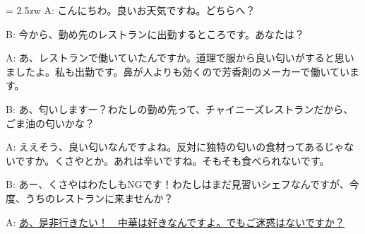 \documentclass[11pt]{amsart}
\title{}
\author{}
\newenvironment{hangall}[1]{\hangindent = 2.5zw\everypar{\hangindent = 2.5zw}}{}
\begin{document}
\maketitle
\begin{hangall}{}%
A: こんにちわ。良いお天気ですね。どちらへ？

B: 今から、勤め先のレストランに出勤するところです。あなたは？

A: あ、レストランで働いていたんですか。道理で服から良い匂いがすると思いましたよ。私も出勤です。鼻が人よりも効くので芳香剤のメーカーで働いています。

B: あ、匂いしますー？わたしの勤め先って、チャイニーズレストランだから、ごま油の匂いかな？

A: ええそう、良い匂いなんですよね。反対に独特の匂いの食材ってあるじゃないですか。くさやとか。あれは辛いですね。そもそも食べられないです。

B: あー、くさやはわたしもNGです！わたしはまだ見習いシェフなんですが、今度、うちのレストランに来ませんか？

A: \ul{あ、是非行きたい！　中華は好きなんですよ。でもご迷惑はないですか？}\end{hangall}
\end{document}
